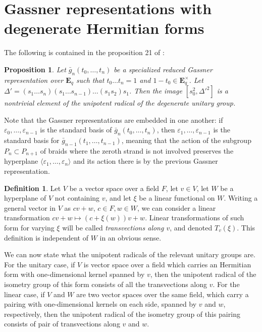 \documentclass{article}
\newtheorem{proposition}[theorem]{Proposition}
\theoremstyle{definition}
\newtheorem{definition}{Definition}[section]
\begin{document}
	\section{Gassner representations with degenerate Hermitian forms} \label{degen}
	The following is contained in the proposition 21 of \cite{cyclic}:
	\begin{proposition}\label{nontriviality1}
		Let $\bar{g}_n(t_0, \ldots, t_n)$ be a specialized reduced Gassner representation over $\mathbf{E}_q$ such that $t_0 \ldots t_n = 1$ and $1 - t_0 \in \mathbf{E}_q^{\times}$. Let $\Delta' = (s_1 \ldots s_n)(s_1 \ldots s_{n-1}) \ldots (s_1s_2) s_1$. Then the image $[s_0^2, \Delta'^2]$ is a nontrivial element of the unipotent radical of the degenerate unitary group. 
	\end{proposition}
	Note that the Gassner representations are embedded in one another: if $\varepsilon_0, \ldots, \varepsilon_{n-1}$ is the standard basis of $\bar{g}_n(t_0, \ldots, t_n)$, then $\varepsilon_1, \ldots, \varepsilon_{n-1}$ is the standard basis for $\bar{g}_{n-1}(t_1, \ldots, t_{n-1})$, meaning that the action of the subgroup $P_n \subset P_{n+1}$ of braids where the zeroth strand is not involved preserves the hyperplane $\langle \varepsilon_1, \ldots, \varepsilon_n \rangle$ and its action there is by the previous Gassner representation. \par 
	\begin{definition}
		Let $V$ be a vector space over a field $F$, let $v \in V$, let $W$ be a hyperplane of $V$ not containing $v$, and let $\xi$ be a linear functional on $W$. Writing a general vector in $V$ as $cv + w$, $c \in F, w \in W$, we can consider a linear transformation $cv + w \mapsto (c + \xi(w))v +w$. Linear transformations of such form for varying $\xi$ will be called \emph{transvections along $v$}, and denoted $T_v(\xi)$. This definition is independent of $W$ in an obvious sense.
	\end{definition}
	We can now state what the unipotent radicals of the relevant unitary groups are. For the unitary case, if $V$ is vector space over a field which carries an Hermitian form with one-dimensional kernel spanned by $v$, then the unipotent radical of the isometry group of this form consists of all the transvections along $v$. For the linear case, if $V$ and $W$ are two vector spaces over the same field, which carry a pairing with one-dimensional kernels on each side, spanned by $v$ and $w$, respectively, then the unipotent radical of the isometry group of this pairing consists of pair of transvections along $v$ and $w$. \par 
\end{document}
